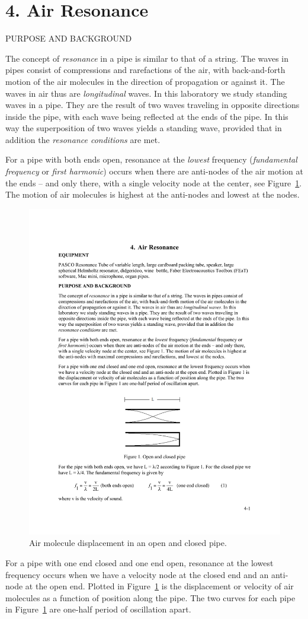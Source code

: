\documentclass[11pt]{NSF}
\begin{document}
     
\section{4. Air Resonance}

PURPOSE AND BACKGROUND

The concept of {\em resonance} in a pipe is similar to that of a string. The waves in
pipes consist of compressions and rarefactions of the air, with back-and-forth
motion of the air molecules in the direction of propagation or against it. The
waves in air thus are {\em longitudinal} waves. In this laboratory we study standing
waves in a pipe. They are the result of two waves traveling in opposite
directions inside the pipe, with each wave being reflected at the ends of the
pipe. In this way the superposition of two waves yields a standing wave,
provided that in addition the {\em resonance conditions} are met.

For a pipe with both ends open, resonance at the {\em lowest} frequency 
({\em fundamental frequency} or {\em first harmonic}) 
occurs when there are anti-nodes of the air motion
at the ends – and only there, with a single velocity node at the center, see
Figure~\ref{f:1}. 
The motion of air molecules is highest at the anti-nodes and lowest at the nodes.
%
\begin{figure}[hbtp]
\begin{center}
\includegraphics[width=.4\textwidth]{fig4_1}
\caption{Air molecule displacement in an open and closed pipe.}
\label{f:1} 
\end{center} 
\end{figure}
%
For a pipe with one end closed and one end open, resonance at the lowest
frequency occurs when we have a velocity node at the closed end and an
anti-node at the open end. Plotted in Figure~\ref{f:1} is the displacement or velocity
of air molecules as a function of position along the pipe. The two curves for
each pipe in Figure~\ref{f:1} are one-half period of oscillation apart.
\end{document}

